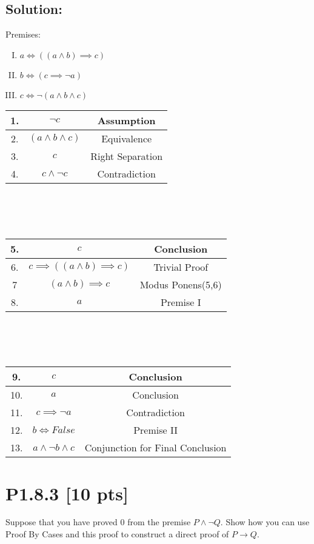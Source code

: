 \documentclass[12pt]{article}
\begin{document}
\subsection*{\textbf{Solution:}}
Premises:
\begin{enumerate}[I.]
    \item $a \iff ((a \land b) \implies c)$

    \item $b \iff (c \implies \neg a)$

    \item $c \iff \neg (a \land b \land c)$
\end{enumerate}
\begin{center}
\begin{tabular}{ |c|c|c| } 
 \hline
 1. & $\neg c$ & Assumption\\ 
\hline
 2. &$(a \land b \land c)$ & Equivalence\\ 
\hline
 3. & $c$ & Right Separation\\
\hline
 4. &$c \land \neg c$ & Contradiction\\
 \hline
\end{tabular}
\\~\\~\\
\begin{tabular}{ |c|c|c| } 
 \hline
 5. & $c$ & Conclusion\\ 
\hline
 6. & $c \implies ((a \land b) \implies c)$ & Trivial Proof\\
\hline
 7 &$(a \land b) \implies c$ & Modus Ponens(5,6)\\
 \hline
 8. &$a$ & Premise I \\
\hline
\end{tabular}
\\~\\~\\
\begin{tabular}{ |c|c|c| } 
 \hline
 9. & $c$ & Conclusion\\ 
\hline
 10. & $a$ & Conclusion\\
\hline
 11. & $c \implies \neg a$ & Contradiction\\
\hline
 12. &$b \iff False$ & Premise II \\
\hline
 13. &$a \land \neg b \land c$ & Conjunction for Final Conclusion \\
\hline
\end{tabular}
\end{center}

\newpage
\section*{\textbf{P1.8.3} [10 pts]}
Suppose that you have proved $0$ from the premise $P \wedge \neg Q$. Show how you can use Proof By Cases and this proof to construct a direct proof of $P \rightarrow Q$.
\end{document}
